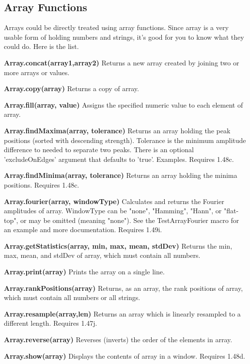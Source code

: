 \documentclass[11pt,a4paper,oneside]{report}
\newenvironment{indentCom}
{\begin{list}{}
         {\setlength{\leftmargin}{1em}}
         \item[]
}
{\end{list}}
\begin{document}
   \subsection{Array Functions}

Arrays could be directly treated using array functions. Since array is a very usable form of holding numbers and strings, it's good for you to know what they could do. Here is the list. 

\begin{shaded}\begin{indentCom}
\item \textbf{Array.concat(array1,array2)} Returns a new array created by
joining two or more arrays or values. 
\item \textbf{Array.copy(array)} Returns a copy of array. 
\item \textbf{Array.fill(array, value)} Assigns the specified numeric value to
each element of array.
\item \textbf{Array.findMaxima(array, tolerance)} Returns an array holding the peak positions (sorted with descending strength). Tolerance is the minimum amplitude difference to needed to separate two peaks. There is an optional 'excludeOnEdges' argument that defaults to 'true'. Examples. Requires 1.48c.
\item \textbf{Array.findMinima(array, tolerance)} Returns an array holding the minima positions. Requires 1.48c.
\item \textbf{Array.fourier(array, windowType)} Calculates and returns the Fourier amplitudes of array. WindowType can be "none", "Hamming", "Hann", or "flat-top", or may be omitted (meaning "none"). See the TestArrayFourier macro for an example and more documentation. Requires 1.49i. 
\item \textbf{Array.getStatistics(array, min, max, mean, stdDev)} Returns the
min, max, mean, and stdDev of array, which must contain all numbers.
\item \textbf{Array.print(array)} Prints the array on a single line. 
\item \textbf{Array.rankPositions(array)} Returns, as an array, the rank
positions of array, which must contain all numbers or all strings. 
\item \textbf{Array.resample(array,len)} Returns an array which is linearly resampled to a different length. Requires 1.47j. 
\item \textbf{Array.reverse(array)} Reverses (inverts) the order of the
elements in array. 
\item \textbf{Array.show(array)} Displays the contents of array in a window. Requires 1.48d.

\end{indentCom}
\end{shaded}
\end{document}
